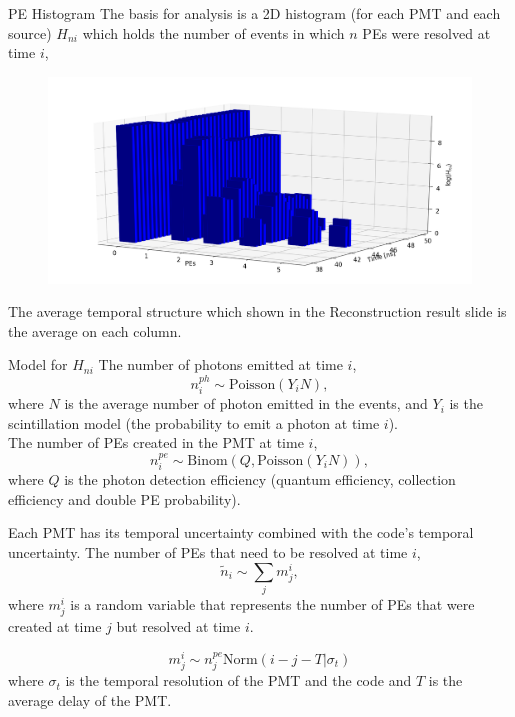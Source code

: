 \documentclass{beamer}
\begin{document}
\begin{frame}{PE Histogram}
The basis for analysis is a 2D histogram (for each PMT and each source) $H_{ni}$ which holds the number of events in which $n$ PEs were resolved at time $i$,
\begin{figure}[h]
\includegraphics[width=0.9\linewidth]{H.png}
\end{figure}
The average temporal structure which shown in the Reconstruction result slide is the average on each column.
\end{frame}


\begin{frame}{Model for $H_{ni}$}
The number of photons emitted at time $i$,
\begin{equation}
n_i^{ph}\sim \text{Poisson}(Y_iN),
\end{equation}
where $N$ is the average number of photon emitted in the events, and $Y_i$ is the scintillation model (the probability to emit a photon at time $i$).\\
The number of PEs created in the PMT at time $i$,
\begin{equation}
n_i^{pe}\sim \text{Binom}(Q, \text{Poisson}(Y_iN)),
\end{equation}
where $Q$ is the photon detection efficiency (quantum efficiency, collection efficiency and double PE probability).
\end{frame}

\begin{frame}
Each PMT has its temporal uncertainty combined with the code's temporal uncertainty. The number of PEs that need to be resolved at time $i$,
\begin{equation}
\tilde n_i\sim \sum_j m_j^i,
\end{equation}
where $m_j^i$ is a random variable that represents the number of PEs that were created at time $j$ but resolved at time $i$.  

\begin{equation}
m_j^i\sim n_j^{pe}\text{Norm}(i-j-T|\sigma_t)
\end{equation}
where $\sigma_t$ is the temporal resolution of the PMT and the code and $T$ is the average delay of the PMT.
\end{frame}
\end{document}
